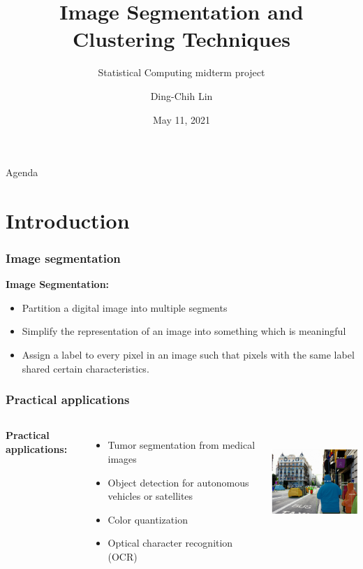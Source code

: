 \documentclass{beamer}
\title[ImageSeg] %
{Image Segmentation and Clustering Techniques}
\subtitle{Statistical Computing midterm project}
\author[D.C.]
{Ding-Chih  Lin}
\institute[NTHU] %
{
National Tsing Hua University, Institute of Statistics
}
\date[May 11, 2021] %
{May 11, 2021}
\begin{document}


\frame{\titlepage}


\begin{frame}{Agenda}
\tableofcontents
\end{frame}


\section{Introduction}


\begin{frame}
\frametitle{Image segmentation}

\begin{description}
	\item[\textbf{Image Segmentation:}\hfill]
\end{description}

\begin{itemize}
	\item Partition a digital image into multiple segments
	\item Simplify the representation of an image into something which is meaningful
	\item Assign a label to every pixel in an image such that pixels with the same label shared certain characteristics.
\end{itemize}

\end{frame}

\begin{frame}
\frametitle{Practical applications}

\begin{columns}
	\begin{description}
		\item[\textbf{Practical applications:}\hfill]
	\end{description}
	\begin{itemize}
		\item Tumor segmentation from medical images
		\item Object detection for autonomous vehicles or satellites
		\item Color quantization
		\item Optical character recognition (OCR) 
	\end{itemize}
	\centering
		\includegraphics[height=4cm, width=5cm]{image/intro.png}
\end{columns}

\end{frame}
\end{document}
